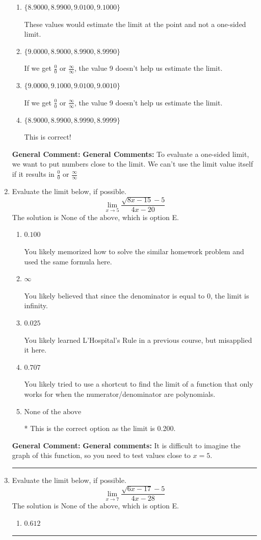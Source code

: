 \documentclass{extbook}[14pt]
\newcommand{\litem}[1]{\item #1

\rule{\textwidth}{0.4pt}}
\begin{document}
\begin{enumerate}
{\begin{enumerate}[label=\Alph*.]
These values would estimate the limit of 9 on the right.
\item \( \{ 8.9000, 8.9900, 9.0100, 9.1000 \} \)

These values would estimate the limit at the point and not a one-sided limit.
\item \( \{ 9.0000, 8.9000, 8.9900, 8.9990 \} \)

If we get $\frac{0}{0}$ or $\frac{\infty}{\infty}$, the value 9 doesn't help us estimate the limit.
\item \( \{ 9.0000, 9.1000, 9.0100, 9.0010 \} \)

If we get $\frac{0}{0}$ or $\frac{\infty}{\infty}$, the value 9 doesn't help us estimate the limit.
\item \( \{ 8.9000, 8.9900, 8.9990, 8.9999 \} \)

This is correct!
\end{enumerate}

\textbf{General Comment:} \textbf{General Comments:} To evaluate a one-sided limit, we want to put numbers close to the limit. We can't use the limit value itself if it results in $\frac{0}{0}$ or $\frac{\infty}{\infty}$
}
\litem{
Evaluate the limit below, if possible.
\[ \lim_{x \rightarrow 5} \frac{\sqrt{8x - 15} - 5}{4x - 20} \]The solution is \( \text{None of the above} \), which is option E.\begin{enumerate}[label=\Alph*.]
\item \( 0.100 \)

You likely memorized how to solve the similar homework problem and used the same formula here.
\item \( \infty \)

You likely believed that since the denominator is equal to 0, the limit is infinity.
\item \( 0.025 \)

You likely learned L'Hospital's Rule in a previous course, but misapplied it here.
\item \( 0.707 \)

You likely tried to use a shortcut to find the limit of a function that only works for when the numerator/denominator are polynomials.
\item \( \text{None of the above} \)

* This is the correct option as the limit is 0.200.
\end{enumerate}

\textbf{General Comment:} \textbf{General comments:} It is difficult to imagine the graph of this function, so you need to test values close to $x = 5$.
}
\litem{
Evaluate the limit below, if possible.
\[ \lim_{x \rightarrow 7} \frac{\sqrt{6x - 17} - 5}{4x - 28} \]The solution is \( \text{None of the above} \), which is option E.\begin{enumerate}[label=\Alph*.]
\item \( 0.612 \)


\end{enumerate}}
\end{enumerate}
\end{document}
